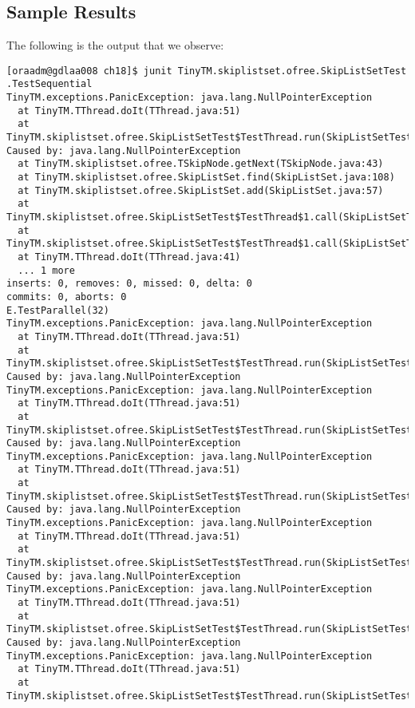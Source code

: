 \subsection{Sample Results}
\par
The following is the output that we observe:
\par
\hfill
\begin{verbatim}
[oraadm@gdlaa008 ch18]$ junit TinyTM.skiplistset.ofree.SkipListSetTest
.TestSequential
TinyTM.exceptions.PanicException: java.lang.NullPointerException
  at TinyTM.TThread.doIt(TThread.java:51)
  at
TinyTM.skiplistset.ofree.SkipListSetTest$TestThread.run(SkipListSetTest.java:128)
Caused by: java.lang.NullPointerException
  at TinyTM.skiplistset.ofree.TSkipNode.getNext(TSkipNode.java:43)
  at TinyTM.skiplistset.ofree.SkipListSet.find(SkipListSet.java:108)
  at TinyTM.skiplistset.ofree.SkipListSet.add(SkipListSet.java:57)
  at
TinyTM.skiplistset.ofree.SkipListSetTest$TestThread$1.call(SkipListSetTest.java:130)
  at
TinyTM.skiplistset.ofree.SkipListSetTest$TestThread$1.call(SkipListSetTest.java:128)
  at TinyTM.TThread.doIt(TThread.java:41)
  ... 1 more
inserts: 0, removes: 0, missed: 0, delta: 0
commits: 0, aborts: 0
E.TestParallel(32)
TinyTM.exceptions.PanicException: java.lang.NullPointerException
  at TinyTM.TThread.doIt(TThread.java:51)
  at
TinyTM.skiplistset.ofree.SkipListSetTest$TestThread.run(SkipListSetTest.java:128)
Caused by: java.lang.NullPointerException
TinyTM.exceptions.PanicException: java.lang.NullPointerException
  at TinyTM.TThread.doIt(TThread.java:51)
  at
TinyTM.skiplistset.ofree.SkipListSetTest$TestThread.run(SkipListSetTest.java:128)
Caused by: java.lang.NullPointerException
TinyTM.exceptions.PanicException: java.lang.NullPointerException
  at TinyTM.TThread.doIt(TThread.java:51)
  at
TinyTM.skiplistset.ofree.SkipListSetTest$TestThread.run(SkipListSetTest.java:128)
Caused by: java.lang.NullPointerException
TinyTM.exceptions.PanicException: java.lang.NullPointerException
  at TinyTM.TThread.doIt(TThread.java:51)
  at
TinyTM.skiplistset.ofree.SkipListSetTest$TestThread.run(SkipListSetTest.java:128)
Caused by: java.lang.NullPointerException
TinyTM.exceptions.PanicException: java.lang.NullPointerException
  at TinyTM.TThread.doIt(TThread.java:51)
  at
TinyTM.skiplistset.ofree.SkipListSetTest$TestThread.run(SkipListSetTest.java:128)
Caused by: java.lang.NullPointerException
TinyTM.exceptions.PanicException: java.lang.NullPointerException
  at TinyTM.TThread.doIt(TThread.java:51)
  at
TinyTM.skiplistset.ofree.SkipListSetTest$TestThread.run(SkipListSetTest.java:128)

\end{verbatim}
